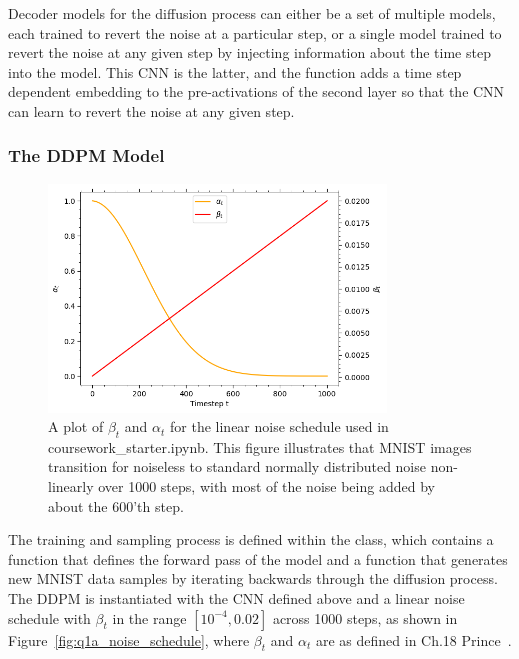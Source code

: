 Decoder models for the diffusion process can either be a set of multiple models, each trained to revert the noise at
a particular step, or a single model trained to revert the noise at any given step by injecting information about the
time step into the model.
This CNN is the latter, and the  function adds a time step dependent embedding to the pre-activations
of the second layer so that the CNN can learn to revert the noise at any given step.

\subsubsection{The DDPM Model}\label{subsubsec:ddpm-model}
\begin{figure}[thb]
    \centering
    \includegraphics[width=0.8\textwidth]{figures/q1a_noise_schedule}
    \caption{A plot of $\beta_{t}$ and $\alpha_{t}$ for the linear noise schedule used in coursework\_starter.ipynb.
        This figure illustrates that MNIST images transition for noiseless to standard normally distributed noise non-linearly
        over 1000 steps, with most of the noise being added by about the 600'th step.}
    \label{fig:q1a_noise_schedule}
\end{figure}

The training and sampling process is defined within the  class, which contains a 
function that defines the forward pass of the model and a
 function that generates new MNIST data samples by iterating backwards through the diffusion process.
The DDPM is instantiated with the CNN defined above and a linear noise schedule with $\beta_{t}$ in the range $[10^{-4},
0.02]$ across 1000 steps, as shown in Figure~\eqref{fig:q1a_noise_schedule}, where $\beta_{t}$ and $\alpha_{t}$ are as
defined in Ch.18 Prince~\cite{prince}.

